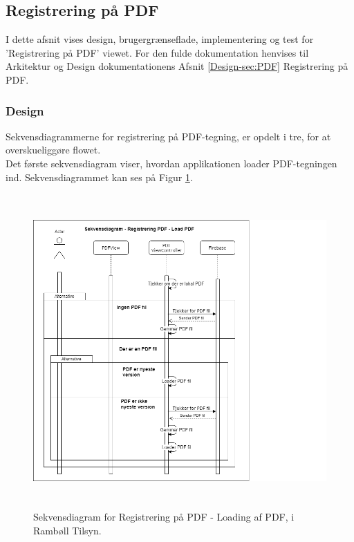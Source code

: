 \subsection{Registrering på PDF}
I dette afsnit vises design, brugergrænseflade, implementering og test for 'Registrering på PDF' viewet. For den fulde dokumentation henvises til Arkitektur og Design dokumentationens Afsnit \ref{Design-sec:PDF} Registrering på PDF.
\subsubsection{Design}
Sekvensdiagrammerne for registrering på PDF-tegning, er opdelt i tre, for at overskueliggøre flowet. \\
Det første sekvensdiagram viser, hvordan applikationen loader PDF-tegningen ind. Sekvensdiagrammet kan ses på Figur \ref{fig:LoadPDFSekvensDiagram}.
\begin{figure}[H] %
	\centering
	\includegraphics[height=12cm, width=15cm]{Design/Applikation/RegistrePDF/LoadPDFSekvensDiagram}
	\caption{Sekvensdiagram for Registrering på PDF - Loading af PDF, i Rambøll Tilsyn.}
	\label{fig:LoadPDFSekvensDiagram}
\end{figure}

\clearpage

